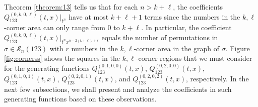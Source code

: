 \documentclass[
final,nomarks
]{dmtcs-episciences}
\newcommand{\tref}[1]{Theorem \ref{theorem:#1}}
\newcommand{\fref}[1]{Figure \ref{fig:#1}}
\newcommand{\Sn}[1]{\mathcal{S}_{#1}}
\newcommand{\Qm}[1]{Q_{123}^{(#1)}(t,x)}
\begin{document}
\tref{13} tells us that for each \begin{math}n> k+\ell\end{math}, the coefficients \begin{math}\Qm{0,k,0,\ell}\big|_{t^n}\end{math} have at most \begin{math}k+\ell+1\end{math} terms since the numbers in the \begin{math}k,\ell\end{math}-corner area can only range from \begin{math}0\end{math} to \begin{math}k+\ell\end{math}. 
In particular, the coefficient \begin{math}\Qm{0,k,0,\ell}\big|_{t^n x^{n-2(k+\ell)+r}}\end{math} equals the number 
of permutations in \begin{math}\sigma \in \Sn{n}(123)\end{math} with \begin{math}r\end{math} numbers in  the \begin{math}k,\ell\end{math}-corner area in the graph of \begin{math}\sigma\end{math}. \fref{cornerss} 
shows the squares in the \begin{math}k,\ell\end{math}-corner regions that we must consider for 
the generating functions \begin{math}\Qm{0,1,0,0}\end{math}, \begin{math}\Qm{0,2,0,0}\end{math}, \begin{math}\Qm{0,1,0,1}\end{math}, \begin{math}\Qm{0,2,0,1}\end{math}, 
and \begin{math}\Qm{0,2,0,2}\end{math}, respectively. In the next few subsections, we shall present and 
analyze the coefficients in such generating functions based on these observations. 
\end{document}
